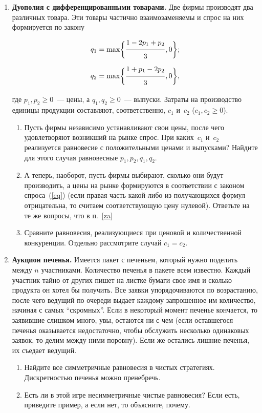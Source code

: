 \documentclass[a4paper,12pt]{article}
\def\hi{\vphantom{\Big)}}
\def\hidr#1#2{\frac{\displaystyle#1\hi}{\displaystyle#2\hi}}
\begin{document}
\begin{enumerate}
\item {\bf Дуополия с дифференцированными товарами.} Две
фирмы производят два различных товара. Эти товары частично
взаимозаменяемы и спрос на них формируется по закону
\begin{equation}\label{eq}
\begin{array}{l}
  q_1=\max\biggl\{\hidr{1-2p_1+p_2}{3},0\biggr\};\\
  q_2=\max\biggl\{\hidr{1+p_1-2p_2}{3},0\biggr\},
\end{array}\end{equation}
где $p_1,p_2\ge 0$~--- цены, а $q_1,q_2\ge 0$~--- выпуски.
Затраты на производство единицы продукции составляют,
соответственно, $c_1$ и~$c_2$ ($c_1,c_2\ge 0$).
\begin{enumerate}
  \item\label{za} Пусть фирмы независимо устанавливают свои цены,
  после чего удовлетворяют возникший на рынке спрос. При каких~$c_1$
  и~$c_2$ реализуется равновесие с положительными ценами и
  выпусками? Найдите для этого случая равновесные $p_1,p_2,q_1,q_2$.
  \item А теперь, наоборот, пусть фирмы выбирают, сколько они
  будут производить, а цены на рынке формируются в соответствии с
  законом спроса~(\ref{eq}) (если правая часть какой-либо из получающихся
  формул отрицательна, то считаем соответствующую цену нулевой).
  Ответьте на те же вопросы, что в п.~\ref{za}
  \item Сравните равновесия, реализующиеся при ценовой и количественной
  конкуренции. Отдельно рассмотрите случай $c_1=c_2$.
\end{enumerate}

\item {\bf Аукцион печенья.} Имеется пакет с печеньем,
который нужно поделить между $n$ участниками. Количество
печенья в пакете всем известно. Каждый участник тайно от
других пишет на листке бумаги свое имя и сколько продукта
он хотел бы получить. Все заявки упорядочиваются по
возрастанию, после чего ведущий по очереди выдает каждому
запрошенное им количество, начиная с самых ``скромных''.
Если в некоторый момент печенье кончается, то заявившие
слишком много, увы, остаются ни с чем (если оставшегося
печенья оказывается недостаточно, чтобы обслужить несколько
одинаковых заявок, то делим между ними поровну). Если же
остались лишние печенья, их съедает ведущий.

\begin{enumerate}

\item Найдите все симметричные равновесия в чистых
стратегиях. Дискретностью печенья можно пренебречь.

\item Есть ли в этой игре несимметричные чистые равновесия?
Если есть, приведите пример, а если нет, то объясните,
почему.

\end{enumerate}

\end{enumerate}
\end{document}
